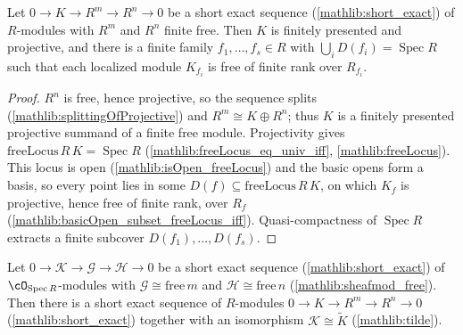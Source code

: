 \begin{lemma}
  \label{lem:module_kernel_free_basicOpen_cover}
  Let \(0\to K\to R^m\to R^n\to 0\) be a short exact sequence
  (\cref{mathlib:short_exact}) of \(R\)-modules with \(R^m\) and \(R^n\) finite
  free.  Then \(K\) is finitely presented and projective, and there is a finite
  family \(f_1,\dots,f_s\in R\) with \(\bigcup_i D(f_i)=\operatorname{Spec}R\) such
  that each localized module \(K_{f_i}\) is free of finite rank over \(R_{f_i}\).
\end{lemma}

\begin{proof}
  \leanok
  \(R^n\) is free, hence projective, so the sequence splits
  (\cref{mathlib:splittingOfProjective}) and \(R^m\cong K\oplus R^n\); thus \(K\) is a
  finitely presented projective summand of a finite free module.  Projectivity gives
  \(\mathrm{freeLocus}\,R\,K=\operatorname{Spec}R\)
  (\cref{mathlib:freeLocus_eq_univ_iff}, \cref{mathlib:freeLocus}).  This locus is
  open (\cref{mathlib:isOpen_freeLocus}) and the basic opens form a basis, so every
  point lies in some \(D(f)\subseteq\mathrm{freeLocus}\,R\,K\), on which \(K_f\) is
  projective, hence free of finite rank, over \(R_f\)
  (\cref{mathlib:basicOpen_subset_freeLocus_iff}).  Quasi-compactness of
  \(\operatorname{Spec}R\) extracts a finite subcover \(D(f_1),\dots,D(f_s)\).
\end{proof}

\begin{lemma}
  \label{lem:kernel_iso_tilde_affine}
  Let \(0\to\mathcal K\to\mathcal G\to\mathcal H\to 0\) be a short exact sequence
  (\cref{mathlib:short_exact}) of \(\cO_{\operatorname{Spec}R}\)-modules with
  \(\mathcal G\cong\mathrm{free}\,m\) and \(\mathcal H\cong\mathrm{free}\,n\)
  (\cref{mathlib:sheafmod_free}).  Then there is a short exact sequence of
  \(R\)-modules \(0\to K\to R^m\to R^n\to 0\) (\cref{mathlib:short_exact}) together
  with an isomorphism \(\mathcal K\cong\widetilde K\) (\cref{mathlib:tilde}).
\end{lemma}

